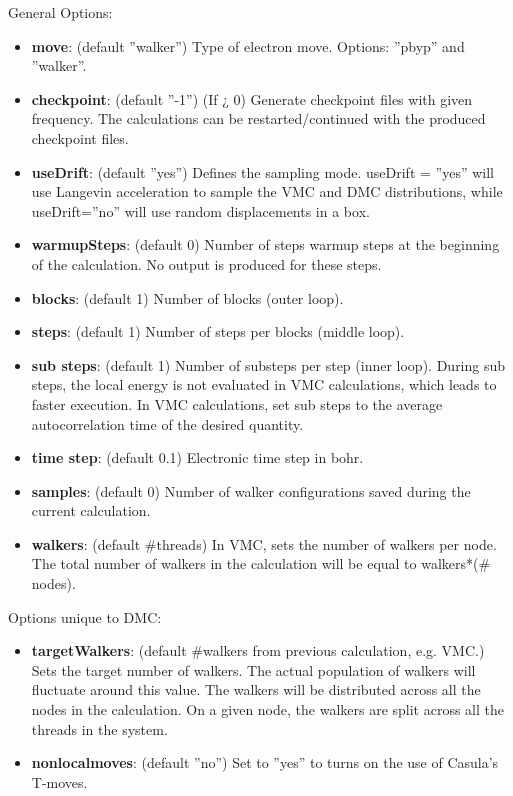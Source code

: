 General Options:
\begin{itemize}
\item{\textbf{move}: (default ”walker”) Type of electron move. Options: ”pbyp” and ”walker”.}
\item{\textbf{checkpoint}: (default ”-1”) (If ¿ 0) Generate checkpoint files with given frequency.
The calculations can be restarted/continued with the produced checkpoint files.}
\item{\textbf{useDrift}: (default ”yes”) Defines the sampling mode. useDrift = ”yes” will
use Langevin acceleration to sample the VMC and DMC distributions, while
useDrift=”no” will use random displacements in a box.}
\item{\textbf{warmupSteps}: (default 0) Number of steps warmup steps at the beginning of the
calculation. No output is produced for these steps.}
\item{\textbf{blocks}: (default 1) Number of blocks (outer loop).}
\item{\textbf{steps}: (default 1) Number of steps per blocks (middle loop).}
\item{\textbf{sub steps}: (default 1) Number of substeps per step (inner loop). During sub steps,
the local energy is not evaluated in VMC calculations, which leads to faster execution.
In VMC calculations, set sub steps to the average autocorrelation time of the desired
quantity.}
\item{\textbf{time step}: (default 0.1) Electronic time step in bohr.}
\item{\textbf{samples}: (default 0) Number of walker configurations saved during the current 
calculation.}
\item{\textbf{walkers}: (default \#threads) In VMC, sets the number of walkers per node. The total
number of walkers in the calculation will be equal to walkers*(\# nodes).}
\end{itemize}

Options unique to DMC:
\begin{itemize}
\item{\textbf{targetWalkers}: (default \#walkers from previous calculation, e.g. VMC.) Sets the
target number of walkers. The actual population of walkers will fluctuate around this
value. The walkers will be distributed across all the nodes in the calculation. On a
given node, the walkers are split across all the threads in the system.}
\item{\textbf{nonlocalmoves}: (default ”no”) Set to ”yes” to turns on the use of Casula’s T-moves.}
\end{itemize}



